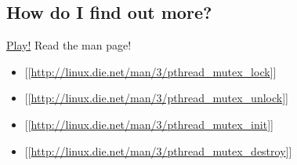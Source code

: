 \begin{Shaded}
\begin{Highlighting}[]
     \NormalTok{;}
     
       \NormalTok{;}
    \NormalTok{\}}


     
\NormalTok{\}}
\end{Highlighting}
\end{Shaded}

\subsection{How do I find out more?}\label{how-do-i-find-out-more}

\href{http://angrave.github.io/sys}{Play!} Read the man page!

\begin{itemize}
\itemsep1pt\parskip0pt
\item
  {[}{[}\url{http://linux.die.net/man/3/pthread_mutex_lock}{]}{]}
\item
  {[}{[}\url{http://linux.die.net/man/3/pthread_mutex_unlock}{]}{]}
\item
  {[}{[}\url{http://linux.die.net/man/3/pthread_mutex_init}{]}{]}
\item
  {[}{[}\url{http://linux.die.net/man/3/pthread_mutex_destroy}{]}{]}
\end{itemize}
